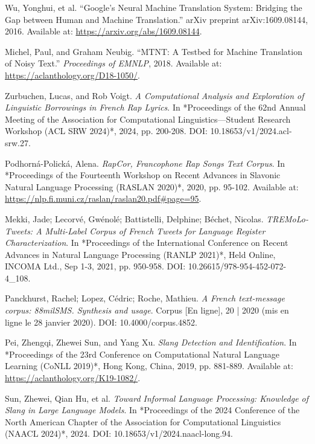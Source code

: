 \documentclass[12pt]{article}
\begin{document}
\begin{thebibliography}{9}
Wu, Yonghui, et al. “Google's Neural Machine Translation System: Bridging the Gap between Human and Machine Translation.” 
arXiv preprint arXiv:1609.08144, 2016. Available at: \url{https://arxiv.org/abs/1609.08144}.

Michel, Paul, and Graham Neubig. “MTNT: A Testbed for Machine Translation of Noisy Text.”
\textit{Proceedings of EMNLP}, 2018. Available at: \url{https://aclanthology.org/D18-1050/}.

Zurbuchen, Lucas, and Rob Voigt.  
\textit{A Computational Analysis and Exploration of Linguistic Borrowings in French Rap Lyrics}.  
In *Proceedings of the 62nd Annual Meeting of the Association for Computational Linguistics\;---\;Student Research Workshop (ACL SRW 2024)*, 2024, pp. 200-208.  
DOI: 10.18653/v1/2024.acl-srw.27.  

Podhorná-Polická, Alena.  
\textit{RapCor, Francophone Rap Songs Text Corpus}.  
In *Proceedings of the Fourteenth Workshop on Recent Advances in Slavonic Natural Language Processing (RASLAN 2020)*, 2020, pp. 95-102.  
Available at: \url{https://nlp.fi.muni.cz/raslan/raslan20.pdf#page=95}.  %

Mekki, Jade; Lecorvé, Gwénolé; Battistelli, Delphine; Béchet, Nicolas.  
\textit{TREMoLo-Tweets: A Multi-Label Corpus of French Tweets for Language Register Characterization}.  
In *Proceedings of the International Conference on Recent Advances in Natural Language Processing (RANLP 2021)*, Held Online, INCOMA Ltd., Sep 1-3, 2021, pp. 950-958.  
DOI: 10.26615/978-954-452-072-4\_108.  

Panckhurst, Rachel; Lopez, Cédric; Roche, Mathieu.  
\textit{A French text-message corpus: 88milSMS. Synthesis and usage}.  
Corpus [En ligne], 20 | 2020 (mis en ligne le 28 janvier 2020).  
DOI: 10.4000/corpus.4852.  

Pei, Zhengqi, Zhewei Sun, and Yang Xu.  
\textit{Slang Detection and Identification}.  
In *Proceedings of the 23rd Conference on Computational Natural Language Learning (CoNLL 2019)*, Hong Kong, China, 2019, pp. 881-889.  
Available at: \url{https://aclanthology.org/K19-1082/}.  %

Sun, Zhewei, Qian Hu, et al.  
\textit{Toward Informal Language Processing: Knowledge of Slang in Large Language Models}.  
In *Proceedings of the 2024 Conference of the North American Chapter of the Association for Computational Linguistics (NAACL 2024)*, 2024.  
DOI: 10.18653/v1/2024.naacl-long.94.  


\end{thebibliography}
\end{document}
